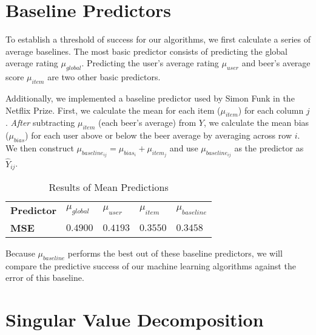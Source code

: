 \documentclass[12pt]{article}
\begin{document}
\section{Baseline Predictors}
To establish a threshold of success for our algorithms, we first calculate a series of average baselines. The most basic predictor consists of predicting the global average rating $\mu_{global}$. Predicting the user's average rating $\mu_{user}$ and beer's average score $\mu_{item}$ are two other basic predictors.

Additionally, we implemented a baseline predictor used by Simon Funk in the Netflix Prize.\textsuperscript{\cite{Funk}} First, we calculate the mean for each item ($\mu_{item}$) for each column $j$. \textit{After} subtracting $\mu_{item}$ (each beer's average) from $Y$, we calculate the mean bias ($\mu_{bias}$) for each user above or below the beer average by averaging across row $i$. We then construct ${\mu}_{baseline_{ij}} = \mu_{bias_i} + \mu_{item_j}$ and use $\mu_{baseline_{ij}}$ as the predictor as $\hat{Y}_{ij}$.


\begin{table}[ht!]
\centering
\caption{Results of Mean Predictions}
\vspace{2mm}
\begin{tabular}{lllll}
\hline
\textbf{Predictor}         & $\mu_{global}$ & $\mu_{user}$ & $\mu_{item}$ & $\mu_{baseline}$ \\
\textbf{MSE}              & $0.4900$       & $0.4193$     & $0.3550$     & $0.3458$         \\ \hline
\end{tabular}
\end{table}

Because ${\mu}_{baseline}$ performs the best out of these baseline predictors, we will compare the predictive success of our machine learning algorithms against the error of this baseline.

\section{Singular Value Decomposition}
\end{document}
